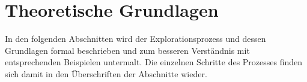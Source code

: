 \chapter{Theoretische Grundlagen}\label{chap_foundation}
In den folgenden Abschnitten wird der Explorationsprozess und dessen Grundlagen formal beschrieben und zum besseren Verständnis mit entsprechenden Beispielen untermalt. Die einzelnen Schritte des Prozesses finden sich damit in den  Überschriften der Abschnitte wieder.






